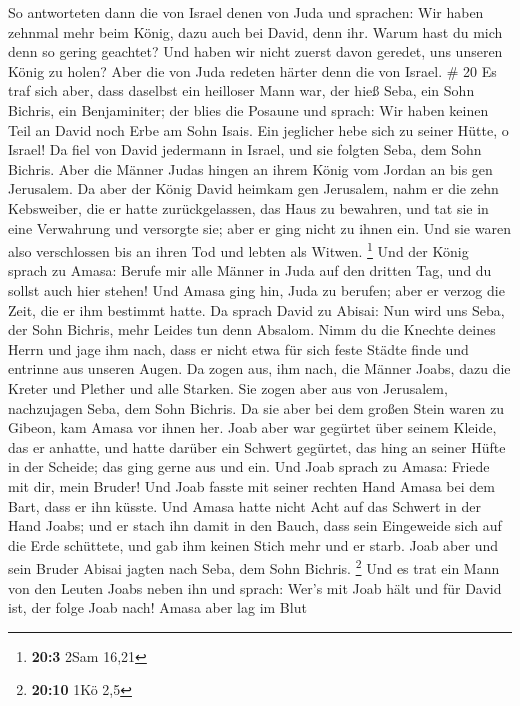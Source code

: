  So antworteten dann die von Israel denen von Juda und
sprachen: Wir haben zehnmal mehr beim König, dazu auch bei David, denn
ihr. Warum hast du mich denn so gering geachtet? Und haben wir nicht
zuerst davon geredet, uns unseren König zu holen? Aber die von Juda
redeten härter denn die von Israel. \# 20  Es traf sich
aber, dass daselbst ein heilloser Mann war, der hieß Seba, ein Sohn
Bichris, ein Benjaminiter; der blies die Posaune und sprach: Wir haben
keinen Teil an David noch Erbe am Sohn Isais. Ein jeglicher hebe sich zu
seiner Hütte, o Israel!  Da fiel von David jedermann in
Israel, und sie folgten Seba, dem Sohn Bichris. Aber die Männer Judas
hingen an ihrem König vom Jordan an bis gen Jerusalem.  Da
aber der König David heimkam gen Jerusalem, nahm er die zehn Kebsweiber,
die er hatte zurückgelassen, das Haus zu bewahren, und tat sie in eine
Verwahrung und versorgte sie; aber er ging nicht zu ihnen ein. Und sie
waren also verschlossen bis an ihren Tod und lebten als Witwen.
\footnote{\textbf{20:3} 2Sam 16,21}  Und der König sprach
zu Amasa: Berufe mir alle Männer in Juda auf den dritten Tag, und du
sollst auch hier stehen!  Und Amasa ging hin, Juda zu
berufen; aber er verzog die Zeit, die er ihm bestimmt hatte.
 Da sprach David zu Abisai: Nun wird uns Seba, der Sohn
Bichris, mehr Leides tun denn Absalom. Nimm du die Knechte deines Herrn
und jage ihm nach, dass er nicht etwa für sich feste Städte finde und
entrinne aus unseren Augen.  Da zogen aus, ihm nach, die
Männer Joabs, dazu die Kreter und Plether und alle Starken. Sie zogen
aber aus von Jerusalem, nachzujagen Seba, dem Sohn Bichris.
 Da sie aber bei dem großen Stein waren zu Gibeon, kam
Amasa vor ihnen her. Joab aber war gegürtet über seinem Kleide, das er
anhatte, und hatte darüber ein Schwert gegürtet, das hing an seiner
Hüfte in der Scheide; das ging gerne aus und ein.  Und
Joab sprach zu Amasa: Friede mit dir, mein Bruder! Und Joab fasste mit
seiner rechten Hand Amasa bei dem Bart, dass er ihn küsste.
 Und Amasa hatte nicht Acht auf das Schwert in der Hand
Joabs; und er stach ihn damit in den Bauch, dass sein Eingeweide sich
auf die Erde schüttete, und gab ihm keinen Stich mehr und er starb. Joab
aber und sein Bruder Abisai jagten nach Seba, dem Sohn Bichris.
\footnote{\textbf{20:10} 1Kö 2,5}  Und es trat ein Mann
von den Leuten Joabs neben ihn und sprach: Wer's mit Joab hält und für
David ist, der folge Joab nach!  Amasa aber lag im Blut
